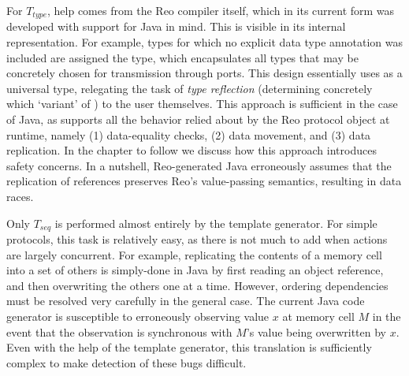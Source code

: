 For $T_{type}$, help comes from the Reo compiler itself, which in its current form was developed with support for Java in mind. This is visible in its internal representation. For example, types for which no explicit data type annotation was included are assigned the  type, which encapsulates all types that may be concretely chosen for transmission through ports. This design essentially uses  as a universal type, relegating the task of \textit{type reflection} (determining concretely which `variant' of ) to the user themselves. This approach is sufficient in the case of Java, as  supports all the behavior relied about by the Reo protocol object at runtime, namely (1) data-equality checks, (2) data movement, and (3) data replication. In the chapter to follow we discuss how this approach introduces safety concerns. In a nutshell, Reo-generated Java erroneously assumes that the replication of  references preserves Reo's value-passing semantics, resulting in data races.

Only $T_{seq}$ is performed almost entirely by the template generator. For simple protocols, this task is relatively easy, as there is not much to add when actions are largely concurrent. For example, replicating the contents of a memory cell into a set of others is simply-done in Java by first reading an object reference, and then overwriting the others one at a time. However, ordering dependencies must be resolved very carefully in the general case. The current Java code generator is susceptible to erroneously observing value $x$ at memory cell $M$ in the event that the observation is synchronous with $M$'s value being overwritten by $x$. Even with the help of the template generator, this translation is sufficiently complex to make detection of these bugs difficult.

